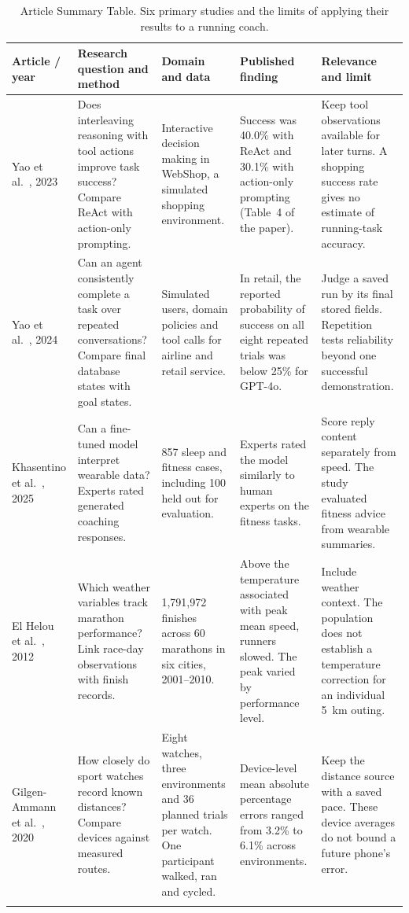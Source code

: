 \documentclass[conference]{IEEEtran}
\begin{document}
\begin{table}[t]
\caption{Article Summary Table. Six primary studies and the limits of applying their results to a running coach.}
\label{tab:papers}\centering\small
\renewcommand{\arraystretch}{1.10}
\begin{tabularx}{\textwidth}{@{}p{2.10cm}YYYY@{}}\toprule
Article / year & Research question and method & Domain and data & Published finding & Relevance and limit\\\midrule
Yao et al.~\cite{react}, 2023 & Does interleaving reasoning with tool actions improve task success? Compare ReAct with action-only prompting. & Interactive decision making in WebShop, a simulated shopping environment. & Success was 40.0\% with ReAct and 30.1\% with action-only prompting (Table~4 of the paper). & Keep tool observations available for later turns. A shopping success rate gives no estimate of running-task accuracy.\\\addlinespace
Yao et al.~\cite{tau}, 2024 & Can an agent consistently complete a task over repeated conversations? Compare final database states with goal states. & Simulated users, domain policies and tool calls for airline and retail service. & In retail, the reported probability of success on all eight repeated trials was below 25\% for GPT-4o. & Judge a saved run by its final stored fields. Repetition tests reliability beyond one successful demonstration.\\\addlinespace
Khasentino et al.~\cite{phllm}, 2025 & Can a fine-tuned model interpret wearable data? Experts rated generated coaching responses. & 857 sleep and fitness cases, including 100 held out for evaluation. & Experts rated the model similarly to human experts on the fitness tasks. & Score reply content separately from speed. The study evaluated fitness advice from wearable summaries.\\\addlinespace
El Helou et al.~\cite{heat}, 2012 & Which weather variables track marathon performance? Link race-day observations with finish records. & 1,791,972 finishes across 60 marathons in six cities, 2001--2010. & Above the temperature associated with peak mean speed, runners slowed. The peak varied by performance level. & Include weather context. The population does not establish a temperature correction for an individual 5~km outing.\\\addlinespace
Gilgen-Ammann et al.~\cite{gnss}, 2020 & How closely do sport watches record known distances? Compare devices against measured routes. & Eight watches, three environments and 36 planned trials per watch. One participant walked, ran and cycled. & Device-level mean absolute percentage errors ranged from 3.2\% to 6.1\% across environments. & Keep the distance source with a saved pace. These device averages do not bound a future phone's error.\\\addlinespace

\end{tabularx}
\end{table}
\end{document}
